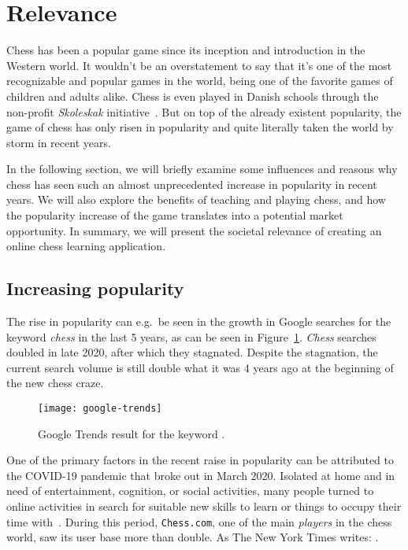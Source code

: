 \section{Relevance}\label{sec:relevance}

Chess has been a popular game since its inception and introduction in the Western world.
It wouldn't be an overstatement to say that it's one of the most recognizable and popular games in the world, being one
of the favorite games of children and adults alike.
Chess is even played in Danish schools through the non-profit \textit{Skoleskak} initiative~\cite{skoleskak2024}.
But on top of the already existent popularity, the game of chess has only risen in popularity and quite literally taken
the world by storm in recent years.

In the following section, we will briefly examine some influences and reasons why chess has seen such an almost
unprecedented increase in popularity in recent years.
We will also explore the benefits of teaching and playing chess, and how the popularity increase of the game translates
into a potential market opportunity.
In summary, we will present the societal relevance of creating an online chess learning application.

\subsection{Increasing popularity}\label{subsec:increasing-popularity}

The rise in popularity can e.g.\ be seen in the growth in Google searches for the keyword \textit{chess} in the last 5
years, as can be seen in Figure~\ref{fig:google-trends}.
\textit{Chess} searches doubled in late 2020, after which they stagnated.
Despite the stagnation, the current search volume is still double what it was 4 years ago at the beginning of the new
chess craze.

\begin{figure}
    \centering
    \texttt{[image: google-trends]}
    \caption{Google Trends result for the keyword .}\label{fig:google-trends}
\end{figure}

One of the primary factors in the recent raise in popularity can be attributed to the COVID-19 pandemic that broke out
in March 2020.
Isolated at home and in need of entertainment, cognition, or social activities, many people turned to online activities
in search for suitable new skills to learn or things to occupy their time with~\cite{nyt2022}.
During this period, \verb|Chess.com|, one of the main \textit{players} in the chess world, saw its user base more than
double.
As The New York Times writes: .

